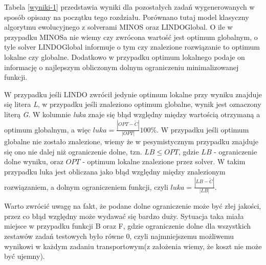 Tabela \ref{wyniki-1} przedstawia wyniki dla pozostałych zadań wygenerowanych w sposób opisany na początku tego rozdziału. Porównano tutaj model klasyczny 
algorytmu ewolucyjnego z solverami MINOS oraz LINDOGlobal. O ile w przypadku MINOSa nie wiemy czy zwrócona wartość jest optimum globalnym, o tyle 
solver LINDOGlobal informuje o tym czy znalezione rozwiązanie to optimum lokalne czy globalne. Dodatkowo w przypadku optimum lokalnego podaje on 
informację o najlepszym obliczonym dolnym ograniczeniu minimalizowanej funkcji. 

W przypadku jeśli LINDO zwrócił jedynie optimum lokalne przy wyniku znajduje się litera \textit{L}, w przypadku jeśli znaleziono optimum globalne, 
wynik jest oznaczony literą \textit{G}. W kolumnie \textit{luka} znaje się błąd względny między wartością otrzymaną a optimum globalnym, 
a więc $luka = \frac{|OPT - \tilde{C}|}{|OPT|} 100 \%$. W przypadku jeśli optimum globalne nie zostało znalezione, wiemy że w pesymistycznym 
przypadku znajduje się ono nie dalej niż ograniczenie dolne, tzn. $LB \le OPT$, gdzie $LB$ - ograniczenie dolne wyniku, oraz $OPT$ - optimum 
lokalne znalezione przez solver. W takim przypadku luka jest obliczana jako błąd względny między znalezionym rozwiązaniem, a dolnym ograniczeniem 
funkcji, czyli $luka = \frac{|LB - \tilde{C}|}{|LB|}$. 

Warto zwrócić uwagę na fakt, że podane dolne ograniczenie może być złej jakości, przez co błąd względny może wydawać się bardzo duży. Sytuacja 
taka miała miejsce w przypadku funkcji B oraz F, gdzie ograniczenie dolne dla wszystkich zestawów zadań testowych było równe $0$, czyli najmniejszemu 
możliwemu wynikowi w każdym zadaniu transportowym(z założenia wiemy, że koszt nie może być ujemny).


